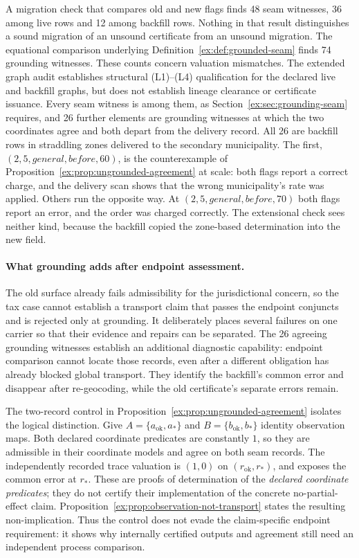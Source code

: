 \documentclass[11pt]{article}
\theoremstyle{definition}
\begin{document}
A migration check that compares old and new flags finds 48 seam witnesses, 36 among live rows and 12 among backfill rows. Nothing in that result distinguishes a sound migration of an unsound certificate from an unsound migration. The equational comparison underlying Definition~\ref{ex:def:grounded-seam} finds 74 grounding witnesses. These counts concern valuation mismatches. The extended graph audit establishes structural (L1)--(L4) qualification for the declared live and backfill graphs, but does not establish lineage clearance or certificate issuance. Every seam witness is among them, as Section~\ref{ex:sec:grounding-seam} requires, and 26 further elements are grounding witnesses at which the two coordinates agree and both depart from the delivery record. All 26 are backfill rows in straddling zones delivered to the secondary municipality. The first, $(2,5,\mathit{general},\mathit{before},60)$, is the counterexample of Proposition~\ref{ex:prop:ungrounded-agreement} at scale: both flags report a correct charge, and the delivery scan shows that the wrong municipality's rate was applied. Others run the opposite way. At $(2,5,\mathit{general},\mathit{before},70)$ both flags report an error, and the order was charged correctly. The extensional check sees neither kind, because the backfill copied the zone-based determination into the new field.

\paragraph{What grounding adds after endpoint assessment.}
The old surface already fails admissibility for the jurisdictional concern, so the tax case cannot establish a transport claim that passes the endpoint conjuncts and is rejected only at grounding. It deliberately places several failures on one carrier so that their evidence and repairs can be separated. The 26 agreeing grounding witnesses establish an additional diagnostic capability: endpoint comparison cannot locate those records, even after a different obligation has already blocked global transport. They identify the backfill's common error and disappear after re-geocoding, while the old certificate's separate errors remain.

The two-record control in Proposition~\ref{ex:prop:ungrounded-agreement} isolates the logical distinction. Give $A=\{a_{\mathrm{ok}},a_*\}$ and $B=\{b_{\mathrm{ok}},b_*\}$ identity observation maps. Both declared coordinate predicates are constantly $1$, so they are admissible in their coordinate models and agree on both seam records. The independently recorded trace valuation is $(1,0)$ on $(r_{\mathrm{ok}},r_*)$, and exposes the common error at $r_*$. These are proofs of determination of the \emph{declared coordinate predicates}; they do not certify their implementation of the concrete no-partial-effect claim. Proposition~\ref{ex:prop:observation-not-transport} states the resulting non-implication. Thus the control does not evade the claim-specific endpoint requirement: it shows why internally certified outputs and agreement still need an independent process comparison.
\end{document}
